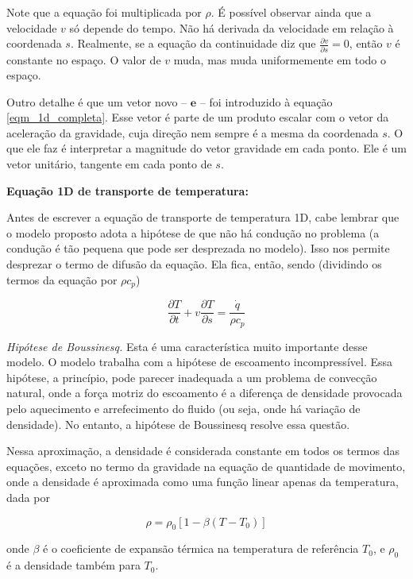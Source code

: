 \documentclass[a4paper,portuguese,10pt]{article}
\renewcommand{\D}{\partial}
\renewcommand{\vec}{\mathbf}
\begin{document}
Note que a equação foi multiplicada por $\rho$. É possível observar ainda que a velocidade $v$ só depende do tempo. Não há derivada da velocidade em relação à coordenada $s$. Realmente, se a equação da continuidade diz que $\frac{\D v}{\D s} = 0$, então $v$ é constante no espaço. O valor de $v$ muda, mas muda uniformemente em todo o espaço.

Outro detalhe é que um vetor novo -- $\vec{e}$ -- foi introduzido à equação \ref{eqm_1d_completa}. Esse vetor é parte de um produto escalar com o vetor da aceleração da gravidade, cuja direção nem sempre é a mesma da coordenada $s$. O que ele faz é interpretar a magnitude do vetor gravidade em cada ponto. Ele é um vetor unitário, tangente em cada ponto de $s$. 

\textbf{Equação 1D de transporte de temperatura:}

Antes de escrever a equação de transporte de temperatura 1D, cabe lembrar que o modelo proposto adota a hipótese de que não há condução no problema (a condução é tão pequena que pode ser desprezada no modelo). Isso nos permite desprezar o termo de difusão da equação. Ela fica, então, sendo (dividindo os termos da equação por $\rho c_p$)

\begin{equation}
  \frac{\D T}{\D t}+v\frac{\D T}{\D s} = \frac{\dot{q}}{\rho c_p}
\end{equation}

{\it Hipótese de Boussinesq.} Esta é uma característica muito importante desse modelo. O modelo trabalha com a hipótese de escoamento incompressível. Essa hipótese, a princípio, pode parecer inadequada a um problema de convecção natural, onde a força motriz do escoamento é a diferença de densidade provocada pelo aquecimento e arrefecimento do fluido (ou seja, onde há variação de densidade). No entanto, a hipótese de Boussinesq resolve essa questão.

Nessa aproximação, a densidade é considerada constante em todos os termos das equações, exceto no termo da gravidade na equação de quantidade de movimento, onde a densidade é aproximada como uma função linear apenas da temperatura, dada por

\begin{equation}
  \rho = \rho_0[1-\beta(T-T_0)]
\end{equation}

onde $\beta$ é o coeficiente de expansão térmica na temperatura de referência $T_0$, e $\rho_0$ é a densidade também para $T_0$.
\end{document}
